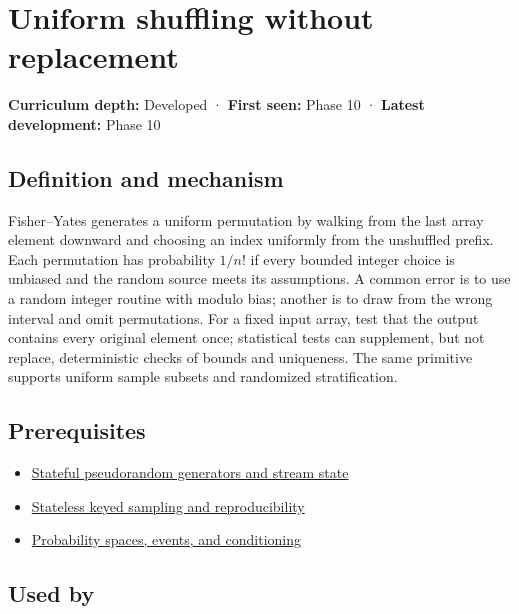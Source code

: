 \hypertarget{appendix-184fcc411663}{}\label{referencestart:appendix-184fcc411663}
\section{Uniform shuffling without replacement}\label{appendix-184fcc411663-uniform-shuffling-without-replacement}

\textbf{Curriculum depth:} Developed · \textbf{First seen:} Phase 10 · \textbf{Latest development:} Phase 10

\subsection{Definition and mechanism}\label{appendix-184fcc411663-definition-and-mechanism}

Fisher--Yates generates a uniform permutation by walking from the last array element downward and choosing an index uniformly from the unshuffled prefix. Each permutation has probability \(1/n!\) if every bounded integer choice is unbiased and the random source meets its assumptions. A common error is to use a random integer routine with modulo bias; another is to draw from the wrong interval and omit permutations. For a fixed input array, test that the output contains every original element once; statistical tests can supplement, but not replace, deterministic checks of bounds and uniqueness. The same primitive supports uniform sample subsets and randomized stratification.

\subsection{Prerequisites}\label{appendix-184fcc411663-prerequisites}

\begin{itemize}
\tightlist
\item
  \hyperref[appendix-e0f7c7e08f3a]{Stateful pseudorandom generators and stream state}
\item
  \hyperref[appendix-daaf25bfd3a0]{Stateless keyed sampling and reproducibility}
\item
  \hyperref[appendix-f1ef323f6ed7]{Probability spaces, events, and conditioning}
\end{itemize}

\subsection{Used by}\label{appendix-184fcc411663-used-by}

